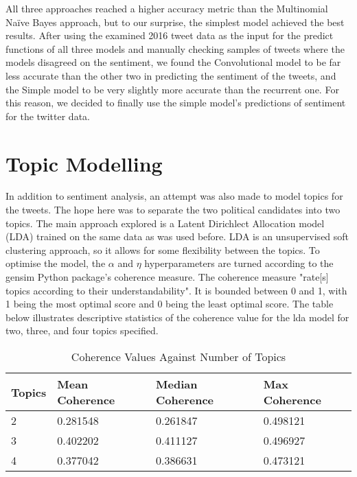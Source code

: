 \documentclass{article}
\begin{document}
  All three approaches reached a higher accuracy metric than the
  Multinomial Naïve Bayes approach, but to our surprise, the simplest
  model achieved the best results. After using the examined 2016 tweet
  data as the input for the predict functions of all three models and
  manually checking samples of tweets where the models disagreed on
  the sentiment, we found the Convolutional model to be far less
  accurate than the other two in predicting the sentiment of the
  tweets, and the Simple model to be very slightly more accurate than
  the recurrent one. For this reason, we decided to finally use the
  simple model’s predictions of sentiment for the twitter data.%
  
  \section{Topic Modelling}

  In addition to sentiment analysis, an attempt was also made to model
  topics for the tweets. The hope here was to separate the two
  political candidates into two topics. The main approach explored is
  a Latent Dirichlect Allocation model (LDA) trained on the same data
  as was used before. LDA is an unsupervised soft clustering approach,
  so it allows for some flexibility between the topics. To optimise the
  model, the $\alpha$ and $\eta$ hyperparameters are turned according
  to the gensim Python package's coherence measure. The coherence
  measure "rate[s] topics according to their understandability". It is
  bounded between 0 and 1, with 1 being the most optimal score and 0
  being the least optimal score. The table below illustrates
  descriptive statistics of the coherence value for the lda model for
  two, three, and four topics specified. 
  
  \begin{table}[H]
    \centering
    \begin{tabular}{||p{2cm} p{3cm} p{3cm} p{2.5cm} ||}
      \hline
      Topics & Mean Coherence & Median Coherence &  Max Coherence \\ \hline
      2 & 0.281548 & 0.261847 & 0.498121 \\
      3 & 0.402202 & 0.411127 & 0.496927 \\
      4 & 0.377042 & 0.386631 & 0.473121 \\
      \hline
    \end{tabular}
    \caption{\label{tab:lda_hyperparameter_table} Coherence Values Against Number of Topics}
  \end{table}
\end{document}
